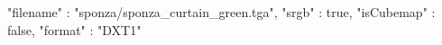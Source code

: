 { 
	"filename" : "sponza/sponza_curtain_green.tga", 
	"srgb" : true,
	"isCubemap" : false,
	"format" : "DXT1"
}